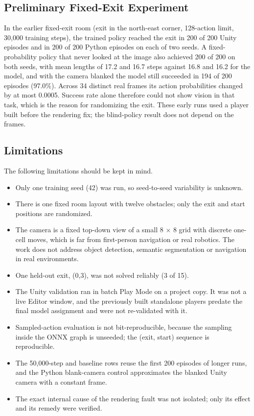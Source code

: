 \documentclass[conference]{IEEEtran}
\begin{document}
\subsection{Preliminary Fixed-Exit Experiment}\label{sec:fixed}
In the earlier fixed-exit room (exit in the north-east corner, 128-action limit, 30,000 training steps), the trained policy reached the exit in 200 of 200 Unity episodes and in 200 of 200 Python episodes on each of two seeds. A fixed-probability policy that never looked at the image also achieved 200 of 200 on both seeds, with mean lengths of 17.2 and 16.7 steps against 16.8 and 16.2 for the model, and with the camera blanked the model still succeeded in 194 of 200 episodes (97.0\%). Across 34 distinct real frames its action probabilities changed by at most 0.0005. Success rate alone therefore could not show vision in that task, which is the reason for randomizing the exit. These early runs used a player built before the rendering fix; the blind-policy result does not depend on the frames.


\subsection{Limitations}
The following limitations should be kept in mind.

\begin{itemize}
\item Only one training seed (42) was run, so seed-to-seed variability is unknown.
\item There is one fixed room layout with twelve obstacles; only the exit and start positions are randomized.
\item The camera is a fixed top-down view of a small 8 $\times$ 8 grid with discrete one-cell moves, which is far from first-person navigation or real robotics. The work does not address object detection, semantic segmentation or navigation in real environments.
\item One held-out exit, (0,3), was not solved reliably (3 of 15).
\item The Unity validation ran in batch Play Mode on a project copy. It was not a live Editor window, and the previously built standalone players predate the final model assignment and were not re-validated with it.
\item Sampled-action evaluation is not bit-reproducible, because the sampling inside the ONNX graph is unseeded; the (exit, start) sequence is reproducible.
\item The 50,000-step and baseline rows reuse the first 200 episodes of longer runs, and the Python blank-camera control approximates the blanked Unity camera with a constant frame.
\item The exact internal cause of the rendering fault was not isolated; only its effect and its remedy were verified.
\end{itemize}
\end{document}

